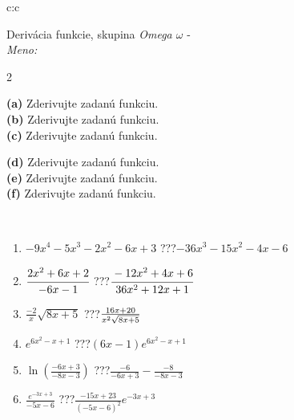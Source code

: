 \documentclass[10pt]{report}
\begin{document}
\newpage
\thispagestyle{empty}
\begin{tabular}{c:c}
\begin{minipage}[c][104.5mm][t]{0.5\linewidth}
\begin{center}
\vspace{7mm}
{\huge Derivácia funkcie, skupina \textit{Omega $\omega$} -}\\[5mm]
\textit{Meno:}\phantom{xxxxxxxxxxxxxxxxxxxxxxxxxxxxxxxxxxxxxxxxxxxxxxxxxxxxxxxxxxxxxxxxx}\\[5mm]
\begin{minipage}{0.95\linewidth}
\begin{center}
{\small \begin{multicols}{2} \raggedright
\textbf{(a)} Zderivujte zadanú funkciu. \\[1mm]
\textbf{(b)} Zderivujte zadanú funkciu. \\[1mm]
\textbf{(c)} Zderivujte zadanú funkciu. \par \columnbreak
\textbf{(d)} Zderivujte zadanú funkciu. \\[1mm]
\textbf{(e)} Zderivujte zadanú funkciu. \\[1mm]
\textbf{(f)} Zderivujte zadanú funkciu.
\end{multicols}
}
\end{center}
\end{minipage}
\\[4mm]
\begin{minipage}{0.79\linewidth}
\begin{center}
\begin{varwidth}{\linewidth}
\begin{enumerate}
\normalsize
\item $-9x^4-5x^3-2x^2-6x+3$\quad \dotfill\; ???\;\dotfill \quad $-36x^3-15x^2-4x-6$
\item $\cfrac{2x^2+6x+2}{-6x-1}$\quad \dotfill\; ???\;\dotfill \quad $\cfrac{-12x^2+4x+6}{36x^2+12x+1}$
\item $\frac{-2}{x}\sqrt{8x+5}$\quad \dotfill\; ???\;\dotfill \quad $\frac{16x+20}{x^2 \sqrt{\smash[b]{8x+5}}}$
\item $e^{6x^2-x+1}$\quad \dotfill\; ???\;\dotfill \quad $(6x-1)e^{6x^2-x+1}$
\item $\ln{\left(\frac{-6x+3}{-8x-3}\right)}$\quad \dotfill\; ???\;\dotfill \quad $\frac{-6}{-6x+3}-\frac{-8}{-8x-3}$
\item $\frac{e^{-3x+3}}{-5x-6}$\quad \dotfill\; ???\;\dotfill \quad $\frac{-15x+23}{(-5x-6)^2}e^{-3x+3}$
\end{enumerate}

\end{varwidth}
\end{center}
\end{minipage}
\end{center}
\end{minipage}
\end{tabular}
\end{document}
